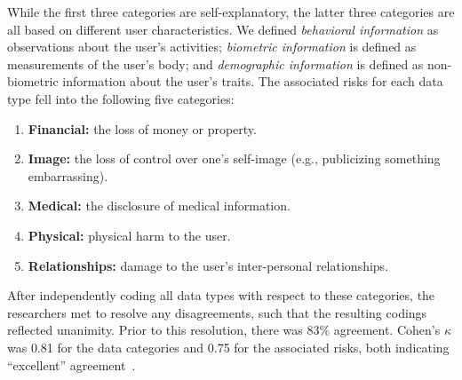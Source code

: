 While the first three categories are self-explanatory, the latter three categories are all based on different user characteristics. We defined {\it behavioral information} as observations about the user's activities; {\it biometric information} is defined as measurements of the user's body; and {\it demographic information} is defined as non-biometric information about the user's traits. The associated risks for each data type fell into the following five categories:
\begin{enumerate}[topsep=0pt,itemsep=-1ex,partopsep=1ex,parsep=1ex]
\item {\bf Financial:} the loss of money or property.
\item {\bf Image:} the loss of control over one's self-image (e.g., publicizing something embarrassing).
\item {\bf Medical:} the disclosure of medical information.
\item {\bf Physical:} physical harm to the user.
\item {\bf Relationships:} damage to the user's inter-personal relationships.
\end{enumerate}

After independently coding all data types with respect to these categories, the researchers met to resolve any disagreements, such that the resulting codings reflected unanimity. Prior to this resolution, there was  83\% agreement. Cohen's $\kappa$ was 0.81 for the data categories and 0.75 for the associated risks, both indicating ``excellent'' agreement~\cite{Fleiss2003}.


